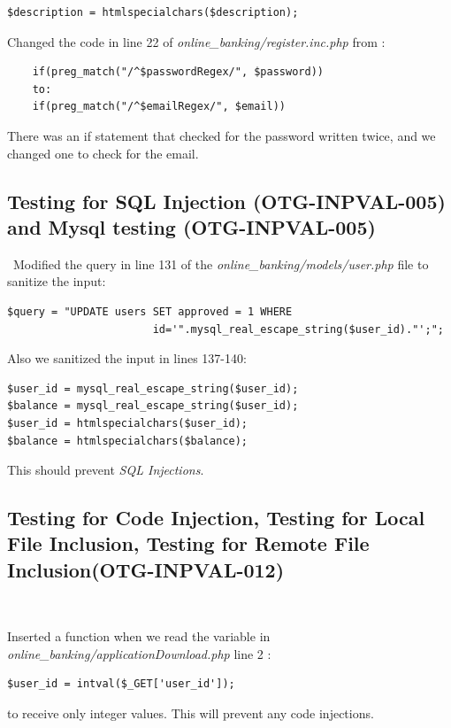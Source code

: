 \documentclass[headsepline,footsepline,footinclude=false,oneside,fontsize=11pt,paper=a4,listof=totoc,bibliography=totoc]{scrbook} %
\begin{document}
\begin{lstlisting} 
$description = htmlspecialchars($description);
\end{lstlisting}

Changed the code in line 22 of \textit{online\_banking/register.inc.php} from :

\begin{lstlisting} 
    if(preg_match("/^$passwordRegex/", $password))
    to:
    if(preg_match("/^$emailRegex/", $email))
\end{lstlisting}
There was an if statement that checked for the password written twice, and we changed one to check for the email.\\



\subsection{Testing for SQL Injection (OTG-INPVAL-005) and Mysql testing (OTG-INPVAL-005)}\
Modified the query in line 131 of the \textit{online\_banking/models/user.php} file to sanitize the input: 
  
\begin{lstlisting} 
$query = "UPDATE users SET approved = 1 WHERE 
                       id='".mysql_real_escape_string($user_id)."';";
\end{lstlisting}
Also we sanitized the input in lines 137-140:

\begin{lstlisting}
$user_id = mysql_real_escape_string($user_id); 
$balance = mysql_real_escape_string($user_id);
$user_id = htmlspecialchars($user_id);
$balance = htmlspecialchars($balance);
\end{lstlisting}

This should prevent \textit{SQL Injections}.\\

\pagebreak
\subsection{Testing for Code Injection, Testing for Local File Inclusion, Testing for Remote File Inclusion(OTG-INPVAL-012)}\


Inserted a function when we read the variable in \textit{online\_banking/applicationDownload.php} line 2 :  

\begin{lstlisting} 
$user_id = intval($_GET['user_id']);
\end{lstlisting} 
to receive only integer values.
This will prevent any code injections.\\
\end{document}
